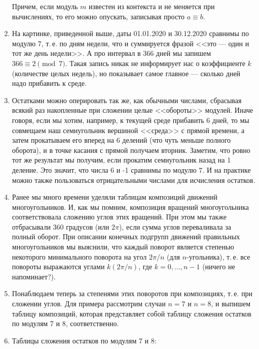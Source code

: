 \begin{enumerate}
Причем, если модуль $m$ известен из контекста и не меняется при вычислениях, то его можно опускать, записывая просто $a\equiv b$. 

\item На картинке, приведенной выше, даты 01.01.2020 и 30.12.2020 сравнимы по модулю 7, т.\,е. по дням недели, что и суммируется фразой <<это --- один и тот же день недели>>.
А про интервал в 366 дней мы запишем $366\equiv 2\pmod 7$. Такая запись никак не информирует нас о коэффициенте $k$ (количестве целых недель), но показывает самое главное --- сколько дней надо прибавить к среде.



\item Остатками можно оперировать так же, как обычными числами, сбрасывая всякий раз накопленные при сложении целые <<обороты>> модулей. Иначе говоря, если мы хотим, например, к текущей среде прибавить 6 дней, то мы совмещаем наш семиугольник вершиной <<среда>> с прямой времени, а затем прокатываем его вперед на 6 делений (что чуть меньше полного оборота), и в точке касания с прямой получаем вторник. Заметим, что ровно тот же результат мы получим, если прокатим семиугольник назад на 1 деление. Это значит, что числа 6 и -1 сравнимы по модулю 7. И на практике можно также пользоваться отрицательными числами для исчисления остатков.
\item Ранее мы много времени уделяли таблицам композиций движений многоугольников. И, как мы помним, композиция вращений многоугольника соответствовала сложению углов этих вращений. При этом мы также отбрасывали 360 градусов (или $2\pi$), если сумма углов переваливала за полный оборот. При описании конечных подгрупп движений правильных многоугольников мы выяснили, что каждый поворот является степенью некоторого минимального поворота на угол $2\pi/n$ (для $n$-угольника), т.\,е. все повороты выражаются углами $k(2\pi/n)$, где $k=0,\dots,n-1$ (ничего не напоминает?).
\item Понаблюдаем теперь за степенями этих поворотов при композициях, т.\,е. при сложении углов. Для примера рассмотрим случаи $n=7$ и $n=8$, и выпишем таблицу композиций, которая представляет собой таблицу сложения остатков по модулям 7 и 8, соответственно.
\item Таблицы сложения остатков по модулям 7 и 8:
\begin{center}

\end{center}
\end{enumerate}
